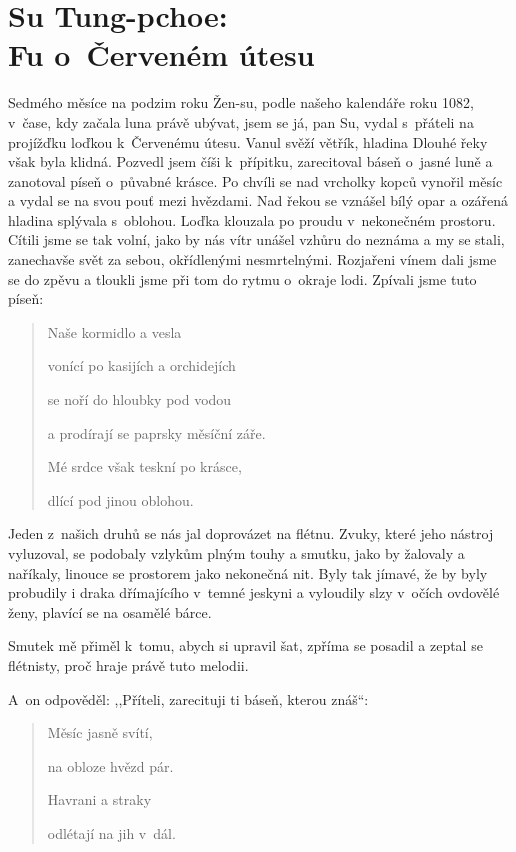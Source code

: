 \section{Su Tung-pchoe: \\ Fu o~Červeném útesu}

\noindent
Sedmého měsíce na podzim roku Žen-su, podle našeho kalendáře roku 1082, v čase, kdy začala luna právě ubývat, jsem se já, pan Su, vydal s přáteli na projížďku loďkou k Červenému útesu. Vanul svěží větřík, hladina Dlouhé řeky však byla klidná. Pozvedl jsem číši k přípitku, zarecitoval báseň o~jasné luně a zanotoval píseň o~půvabné krásce. Po chvíli se nad vrcholky kopců vynořil měsíc a vydal se na svou pouť mezi hvězdami. Nad řekou se vznášel bílý opar a ozářená hladina splývala s oblohou. Loďka klouzala po proudu v nekonečném prostoru. Cítili jsme se tak volní, jako by nás vítr unášel vzhůru do neznáma a my se stali, zanechavše svět za sebou, okřídlenými nesmrtelnými. Rozjařeni vínem dali jsme se do zpěvu a tloukli jsme při tom do rytmu o~okraje lodi. Zpívali jsme tuto píseň:

\smallskip

\begin{verse}

Naše kormidlo a vesla 

vonící po kasijích a orchidejích

se noří do hloubky pod vodou

a prodírají se paprsky měsíční záře.

Mé srdce však teskní po krásce,

dlící pod jinou oblohou.

\end{verse}

\smallskip

Jeden z našich druhů se nás jal doprovázet na flétnu. Zvuky, které jeho nástroj vyluzoval, se podobaly vzlykům plným touhy a smutku, jako by žalovaly a naříkaly, linouce se prostorem jako nekonečná nit. Byly tak jímavé, že by byly probudily i draka dřímajícího v temné jeskyni a vyloudily slzy v očích ovdovělé ženy, plavící se na osamělé bárce.

Smutek mě přiměl k tomu, abych si upravil šat, zpříma se posadil a zeptal se flétnisty, proč hraje právě tuto melodii.

A~on odpověděl: ,,Příteli, zarecituji ti báseň, kterou znáš``:

\smallskip

\begin{verse}

Měsíc jasně svítí,

na obloze hvězd pár.

Havrani a straky

odlétají na jih v dál.

\end{verse}

